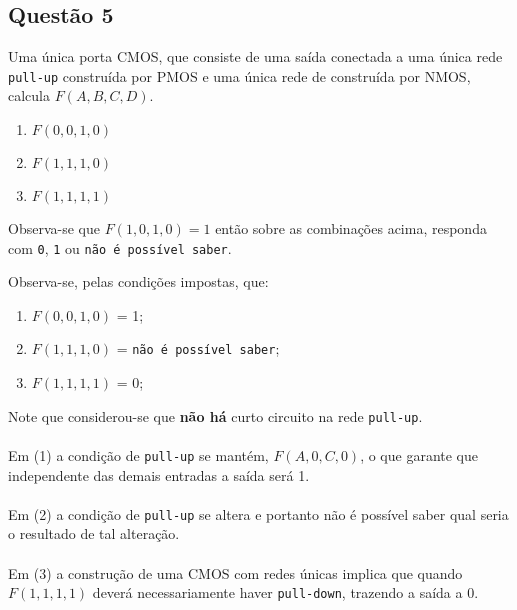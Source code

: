 \documentclass{article}
\begin{document}
\newpage
        \subsection{Questão 5}
            \begin{exercise}
                Uma única porta CMOS, que consiste de uma saída conectada a uma única rede \texttt{pull-up} construída por PMOS e uma única rede de  construída por NMOS, calcula $F(A,B,C,D)$.
                    \begin{enumerate}[noitemsep]
                        \item $F(0,0,1,0)$
                        \item $F(1,1,1,0)$
                        \item $F(1,1,1,1)$
                    \end{enumerate}
                Observa-se que $F(1,0,1,0)=1$ então sobre as combinações acima, responda com \texttt{0}, \texttt{1} ou \texttt{não é possível saber}.
            \end{exercise}
            \begin{resolution}
                Observa-se, pelas condições impostas, que:
                    \begin{enumerate}[noitemsep]
                        \item $F(0,0,1,0)$ = 1;
                        \item $F(1,1,1,0)$ = \texttt{não é possível saber};
                        \item $F(1,1,1,1)$ = 0;
                    \end{enumerate}
                Note que considerou-se que \textbf{não há} curto circuito na rede \texttt{pull-up}.
                \\\\
                Em (1) a condição de \texttt{pull-up} se mantém, $F(A,0,C,0)$, o que garante que independente das demais entradas a saída será 1.
                \\\\
                Em (2) a condição de \texttt{pull-up} se altera e portanto não é possível saber qual seria o resultado de tal alteração.
                \\\\
                Em (3) a construção de uma CMOS com redes únicas implica que quando $F(1,1,1,1)$ deverá necessariamente haver \texttt{pull-down}, trazendo a saída a 0.
            \end{resolution}
\end{document}
